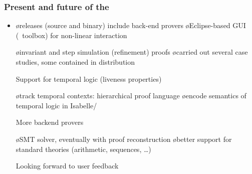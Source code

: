 \documentclass[fleqn]{beamer}
\begin{document}
\begin{frame}
  \frametitle{Present and \alert{future} of the \tlaps}

  \begin{itemize}
  \item {}

    \begin{itemize}
    \o releases (source and binary) include back-end provers
    \o Eclipse-based GUI (\tlaplus\ toolbox) for non-linear interaction
    \end{itemize}

  \oo {}

    \begin{itemize}
    \o invariant and step simulation (refinement) proofs
    \o carried out several case studies, some contained in distribution
    \end{itemize}

  \oo \alert{Support for temporal logic (liveness properties)}

    \begin{itemize}
    \o track temporal contexts: hierarchical proof language
    \o encode semantics of temporal logic in Isabelle/\tlaplus
    \end{itemize}

  \oo \alert{More backend provers}

    \begin{itemize}
    \o SMT solver, eventually with proof reconstruction
    \o better support for standard theories (arithmetic, sequences, \ldots)
    \end{itemize}

  \oo \alert{Looking forward to user feedback}
  \end{itemize}
\end{frame}
\end{document}
